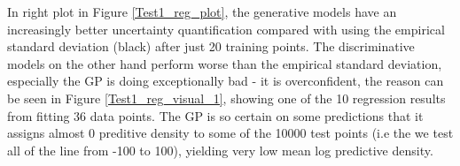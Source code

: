 In right plot in Figure \ref{Test1_reg_plot}, the generative models have an increasingly better
uncertainty quantification compared with using the empirical standard deviation (black) after just
20 training points.
The discriminative models on the other hand perform worse than the empirical standard deviation,
especially the GP is doing exceptionally bad - it is overconfident, the reason can be seen in Figure
\ref{Test1_reg_visual_1}, showing one of the 10 regression results from fitting 36 data points. The
GP is so certain on some predictions that it assigns almost 0 preditive density to some of the 10000
test points (i.e the we test all of the line from -100 to 100), yielding very low mean log
predictive density. 
